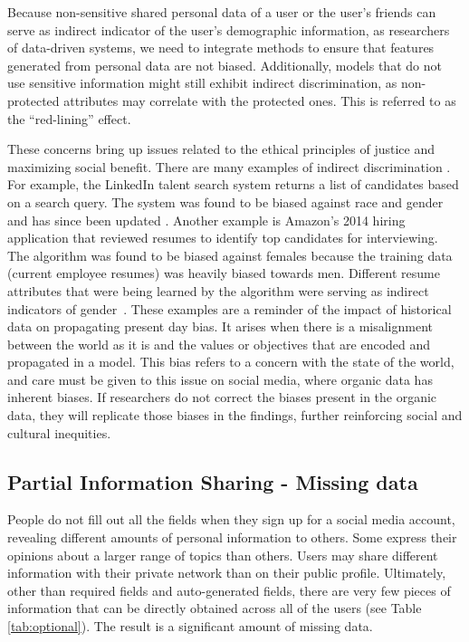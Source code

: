 \documentclass[11pt]{article} %
\begin{document}
Because non-sensitive shared personal data of a user or the user's friends can serve as indirect indicator of the user's demographic information, as researchers of data-driven systems, we need to integrate methods to ensure that features generated from personal data are not biased. Additionally, models that do not use sensitive information might still exhibit indirect discrimination, as non-protected attributes may correlate with the protected ones. This is referred to as the ``red-lining'' effect. 

These concerns bring up issues related to the ethical principles of justice and maximizing social benefit. There are many examples of indirect discrimination \cite{oneil2016}. For example, the LinkedIn talent search system returns a list of candidates based on a search query. The system was found to be biased against race and gender and has since been updated \cite{linkedin_unfair}. Another example is Amazon's 2014 hiring application that reviewed resumes to identify top candidates for interviewing. The algorithm was found to be biased against females because the training data (current employee resumes) was heavily biased towards men. Different resume attributes that were being learned by the algorithm were serving as indirect indicators of gender~\cite{dastin_2018}.
These examples are a reminder of the impact of historical data on propagating present day bias. It arises when there is a misalignment between the world as it is and the values or objectives that are encoded and propagated in a model. This bias refers to a concern with the state of the world, and care must be given to this issue on social media, where organic data has inherent biases. If researchers do not correct the biases present in the organic data, they will replicate those biases in the findings, further reinforcing social and cultural inequities. 


\subsection{Partial Information Sharing - Missing data}
People do not fill out all the fields when they sign up for a social media account, revealing different amounts of personal information to others.  Some express their opinions about a larger range of topics than others. Users may share different information with their private network than on their public profile. Ultimately, other than required fields and auto-generated fields, there are very few pieces of information that can be directly obtained across all of the users (see Table \ref{tab:optional}). The result is a significant amount of missing data. 
\end{document}
